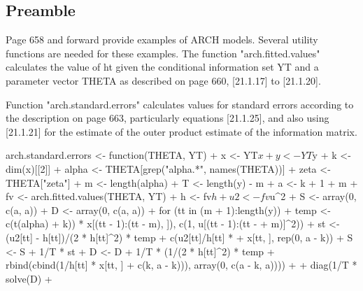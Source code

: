 \documentclass[a4paper]{article}
\renewcommand{\~}{\perispomeni}%
\begin{document}
\subsection{Preamble}
Page 658 and forward provide examples of ARCH models.  Several utility functions are needed for these examples.
The function "arch.fitted.values" calculates the value of ht given the conditional information set YT and
a parameter vector THETA as described on page 660, [21.1.17] to [21.1.20].
\begin{Schunk}
\end{Schunk}
Function "arch.standard.errors" calculates values for standard errors according to the description on page 663,
particularly equations [21.1.25], and also using [21.1.21] for the estimate of the outer product estimate of the
information matrix.
\begin{Schunk}
\begin{Sinput}
 arch.standard.errors <- function(THETA, YT) {
+     x <- YT$x
+     y <- YT$y
+     k <- dim(x)[[2]]
+     alpha <- THETA[grep("alpha.*", names(THETA))]
+     zeta <- THETA["zeta"]
+     m <- length(alpha)
+     T <- length(y) - m
+     a <- k + 1 + m
+     fv <- arch.fitted.values(THETA, YT)
+     h <- fv$h
+     u2 <- fv$u^2
+     S <- array(0, c(a, a))
+     D <- array(0, c(a, a))
+     for (tt in (m + 1):length(y)) {
+         temp <- c(t(alpha) %
+             k)) * x[(tt - 1):(tt - m), ]), c(1, u[(tt - 1):(tt - 
+             m)]^2))
+         st <- (u2[tt] - h[tt])/(2 * h[tt]^2) * temp + c(u2[tt]/h[tt] * 
+             x[tt, ], rep(0, a - k))
+         S <- S + 1/T * st %
+         D <- D + 1/T * (1/(2 * h[tt]^2) * temp %
+             rbind(cbind(1/h[tt] * x[tt, ] %
+                 c(k, a - k))), array(0, c(a - k, a))))
+     }
+     diag(1/T * solve(D) %
+ }
\end{Sinput}
\end{Schunk}
\end{document}

